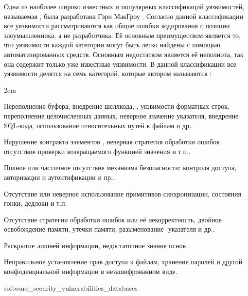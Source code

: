 %
Одна из наиболее широко известных и популярных классификаций уязвимостей, называемая 
, была разработана Гэри МакГроу 
  . 
%
Согласно данной классификации все уязвимости рассматриваются как общие ошибки кодирования 
с позиции злоумышленника, а не разработчика. 
%
Её основным преимуществом является то, что уязвимости каждой категории могут быть легко найдены с 
помощью автоматизированных средств. 
%
Основным недостатком является её неполнота, так она содержит только уже известные уязвимости. 
%
В данной классификации все уязвимости делятся на семь категорий, которые автором называются 
:  
\begin{description}
	\leftskip2em%
	\setlength{\itemsep}{0pt}%
	\setlength{\parsep}{0pt}%

	\item[Проверка входных данных и их представление.] Переполнение буфера, внедрение шеллкода, 
		, уязвимости форматных строк, переполнение целочисленных данных, 
		неверное значение указателя, внедрение SQL-кода, использование относительных путей к файлам 
		и др..
	\item[Неправильное использование API.] Нарушение контракта элементов 
		, неверная стратегия обработки ошибок отсутствие проверки 
		возвращаемого функцией значения и т.п..
	\item[Средства безопасности.] Полное или частичное отсутствие механизма безопасности: контроля 
		доступа, авторизации и аутентификации и пр..
	\item[Время и состояние.] Отсутствие или неверное использование примитивов синхронизации, 
		состояния гонки, дедлоки и т.п.
	\item[Ошибки.] Отсутствие стратегии обработки ошибок или её некорректность, двойное освобождение 
		памяти, утечки памяти, разыменование -указателя и др..
	\item[Инкапсуляция.] Раскрытие лишней информации, недостаточное знание основ 
		.
	\item[Программное окружение.] Неправильное установление прав доступа к файлам, хранение паролей 
		и другой конфиденциальной информации в незашифрованном виде.
\end{description}

	{software_security_vulnerabilities_databases}

